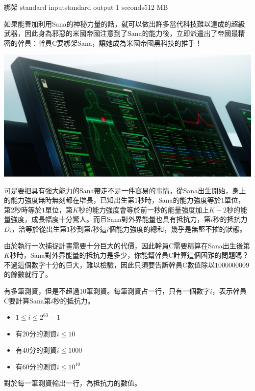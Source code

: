 \gdef\thisproblemauthor{}
\gdef\thisproblemdeveloper{}
\gdef\thisproblemorigin{}
\begin{problem}{綁架}
{standard input}{standard output}
{1 seconds}{512 MB}{}

如果能善加利用Sana的神秘力量的話，就可以做出許多當代科技難以達成的超級武器，因此身為邪惡的米國帝國注意到了Sana的能力後，立即派遣出了帝國最精密的幹員：幹員C要綁架Sana，讓她成為米國帝國黑科技的推手！

\centerline{\includegraphics[scale=0.5]{./pics/D.png}}

可是要把具有強大能力的Sana帶走不是一件容易的事情，從Sana出生開始，身上的能力強度無時無刻都在增長，已知出生第$1$秒時，Sana的能力強度等於$1$單位，第$2$秒時等於$1$單位，第$K$秒的能力強度會等於前一秒的能量強度加上$K-2$秒的能量強度，成長幅度十分驚人。而且Sana對外界能量也具有抵抗力，第$i$秒的抵抗力$D_i$，洽等於從出生第$1$秒到第$i$秒這$i$個能力強度的總和，幾乎是無堅不摧的狀態。

由於執行一次捕捉計畫需要十分巨大的代價，因此幹員C需要精算在Sana出生後第$K$秒時，Sana對外界能量的抵抗力是多少，你能幫幹員C計算這個困難的問題嗎？不過這個數字十分的巨大，難以檢驗，因此只須要告訴幹員C數值除以$1000000009$的餘數就行了。


\InputFile

有多筆測資，但是不超過10筆測資。每筆測資占一行，只有一個數字$i$，表示幹員C要計算Sana第$i$秒的抵抗力。

\begin{iofmt}
\begin{itemize}
	\item $1 \leq i \leq 2^{63}-1$
	\item 有$20$分的測資$i\leq 10$
	\item 有$40$分的測資$i\leq 1000$
	\item 有$60$分的測資$i\leq 10^{10}$
\end{itemize}
\end{iofmt}

\OutputFile

對於每一筆測資輸出一行，為抵抗力的數值。

\Examples

\begin{example}
%
\end{example}

\end{problem}
